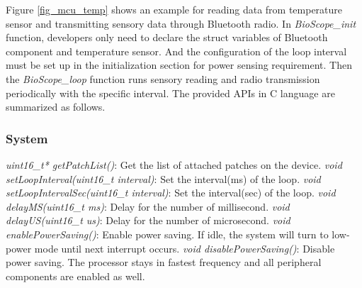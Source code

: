 Figure \ref{fig_mcu_temp} shows an example for reading data from temperature sensor and transmitting sensory data through Bluetooth radio.
In \textit{BioScope\_init} function, developers only need to declare the struct variables of Bluetooth component and temperature sensor. And the configuration of the loop interval must be set up in the initialization section for power sensing requirement.
Then the \textit{BioScope\_loop} function runs sensory reading and radio transmission periodically with the specific interval.
The provided APIs in C language are summarized as follows.

\subsubsection{System}
\textit{uint16\_t* getPatchList()}: Get the list of attached patches on the device.
\vspace{10pt}
\newline
\textit{void setLoopInterval(uint16\_t interval)}: Set the interval(ms) of the loop.
\vspace{10pt}
\newline
\textit{void setLoopIntervalSec(uint16\_t interval)}: Set the interval(sec) of the loop.
\vspace{10pt}
\newline
\textit{void delayMS(uint16\_t ms)}: Delay for the number of millisecond.
\vspace{10pt}
\newline
\textit{void delayUS(uint16\_t us)}: Delay for the number of microsecond.
\vspace{10pt}
\newline
\textit{void enablePowerSaving()}: Enable power saving. If idle, the system will turn to low-power mode until next interrupt occurs.
\vspace{10pt}
\newline
\textit{void disablePowerSaving()}: Disable power saving. The processor stays in fastest frequency and all peripheral components are enabled as well.
\newline

